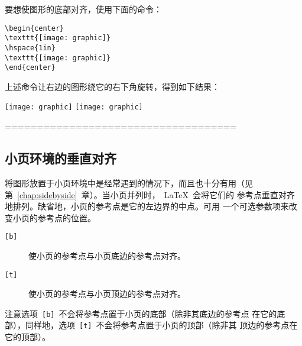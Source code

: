 要想使图形的底部对齐，使用下面的命令：
\begin{lstlisting}
\begin{center}
\texttt{[image: graphic]}
\hspace{1in}
\texttt{[image: graphic]}
\end{center}
\end{lstlisting}
上述命令让右边的图形绕它的右下角旋转，得到如下结果：
\begin{center}
	\texttt{[image: graphic]}
	\hspace{1in}
	\texttt{[image: graphic]}
\end{center}

====================================
\subsection{小页环境的垂直对齐}\label{ssec:minivalign}

将图形放置于小页环境中是经常遇到的情况下，而且也十分有用（见
第~\ref{chap:sidebyside}~章）。当小页并列时，~\LaTeX{}~会将它们的
参考点垂直对齐地排列。缺省地，小页的参考点是它的左边界的中点。可用
一个可选参数项来改变小页的参考点的位置。

\begin{description}
\item[\texttt{[b]}] 使小页的参考点与小页底边的参考点对齐。
\item[\texttt{[t]}] 使小页的参考点与小页顶边的参考点对齐。
\end{description}

注意选项~\texttt{[b]}~不会将参考点置于小页的底部（除非其底边的参考点
在它的底部），同样地，选项~\texttt{[t]}~不会将参考点置于小页的顶部（除非其
顶边的参考点在它的顶部）。

